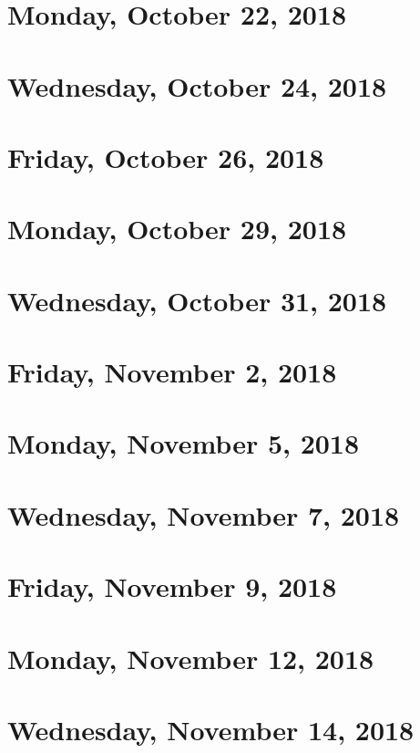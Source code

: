 \documentclass[reqno]{amsart}
\begin{document}
\section{Monday, October 22, 2018}
    
    
\section{Wednesday, October 24, 2018}
    

\section{Friday, October 26, 2018}
    

\section{Monday, October 29, 2018}
    
    
\section{Wednesday, October 31, 2018}
    

\section{Friday, November 2, 2018}
    

\section{Monday, November 5, 2018}
    
    
\section{Wednesday, November 7, 2018}
    

\section{Friday, November 9, 2018}
    
    
\section{Monday, November 12, 2018}
    
    
\section{Wednesday, November 14, 2018}
    
\end{document}
